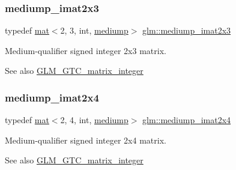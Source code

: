 \subsubsection{\texorpdfstring{mediump\+\_\+imat2x3}{mediump\_imat2x3}}
{\footnotesize\ttfamily typedef \mbox{\hyperlink{structglm_1_1mat}{mat}}$<$2, 3, int, \mbox{\hyperlink{namespaceglm_a36ed105b07c7746804d7fdc7cc90ff25a6416f3ea0c9025fb21ed50c4d6620482}{mediump}}$>$ \mbox{\hyperlink{group__gtc__matrix__integer_ga1e2d944bde5dfe9fe49824c4c3457e30}{glm\+::mediump\+\_\+imat2x3}}}

Medium-\/qualifier signed integer 2x3 matrix. \begin{DoxySeeAlso}{See also}
\mbox{\hyperlink{group__gtc__matrix__integer}{G\+L\+M\+\_\+\+G\+T\+C\+\_\+matrix\+\_\+integer}} 
\end{DoxySeeAlso}
\mbox{\label{group__gtc__matrix__integer_gabc256c695f6fe794f809f2d1ee667d6e}} 
\subsubsection{\texorpdfstring{mediump\+\_\+imat2x4}{mediump\_imat2x4}}
{\footnotesize\ttfamily typedef \mbox{\hyperlink{structglm_1_1mat}{mat}}$<$2, 4, int, \mbox{\hyperlink{namespaceglm_a36ed105b07c7746804d7fdc7cc90ff25a6416f3ea0c9025fb21ed50c4d6620482}{mediump}}$>$ \mbox{\hyperlink{group__gtc__matrix__integer_gabc256c695f6fe794f809f2d1ee667d6e}{glm\+::mediump\+\_\+imat2x4}}}

Medium-\/qualifier signed integer 2x4 matrix. \begin{DoxySeeAlso}{See also}
\mbox{\hyperlink{group__gtc__matrix__integer}{G\+L\+M\+\_\+\+G\+T\+C\+\_\+matrix\+\_\+integer}} 
\end{DoxySeeAlso}
\mbox{\label{group__gtc__matrix__integer_gac6ab7a5cfe157ba8deb79a7691ad8263}} 
